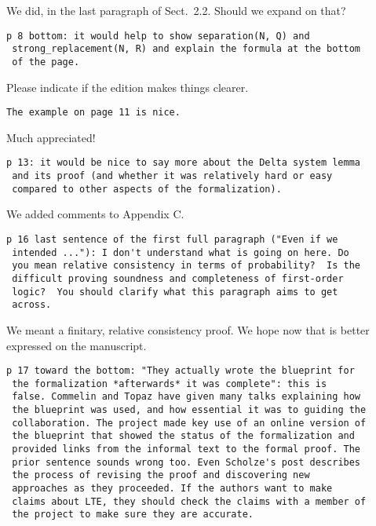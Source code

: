 \documentclass[runningheads]{llncs}
\begin{document}
We did, in the last paragraph of Sect.~2.2. Should we expand on
that?

\begin{verbatim}
p 8 bottom: it would help to show separation(N, Q) and
 strong_replacement(N, R) and explain the formula at the bottom
 of the page.
\end{verbatim}

Please indicate if the edition makes things clearer.

\begin{verbatim}
The example on page 11 is nice.
\end{verbatim}

Much appreciated!

\begin{verbatim}
p 13: it would be nice to say more about the Delta system lemma
 and its proof (and whether it was relatively hard or easy
 compared to other aspects of the formalization).
\end{verbatim}

We added comments to Appendix C.

\begin{verbatim}
p 16 last sentence of the first full paragraph ("Even if we
 intended ..."): I don't understand what is going on here. Do
 you mean relative consistency in terms of probability?  Is the
 difficult proving soundness and completeness of first-order
 logic?  You should clarify what this paragraph aims to get
 across.
\end{verbatim}

We meant a finitary, relative consistency proof. We hope now
that is better expressed on the manuscript.

\begin{verbatim}
p 17 toward the bottom: "They actually wrote the blueprint for
 the formalization *afterwards* it was complete": this is
 false. Commelin and Topaz have given many talks explaining how
 the blueprint was used, and how essential it was to guiding the
 collaboration. The project made key use of an online version of
 the blueprint that showed the status of the formalization and
 provided links from the informal text to the formal proof. The
 prior sentence sounds wrong too. Even Scholze's post describes
 the process of revising the proof and discovering new
 approaches as they proceeded. If the authors want to make
 claims about LTE, they should check the claims with a member of
 the project to make sure they are accurate.
\end{verbatim}
\end{document}

